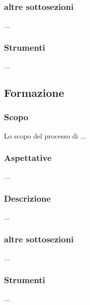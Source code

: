     \subsubsection{altre sottosezioni}
    ...
    \subsubsection{Strumenti}
    ...

\subsection{Formazione} %
    \subsubsection{Scopo}
    Lo scopo del processo di ...
    \subsubsection{Aspettative}
    ...
    \subsubsection{Descrizione}
    ...
    \subsubsection{altre sottosezioni}
    ...
    \subsubsection{Strumenti}
    ...

